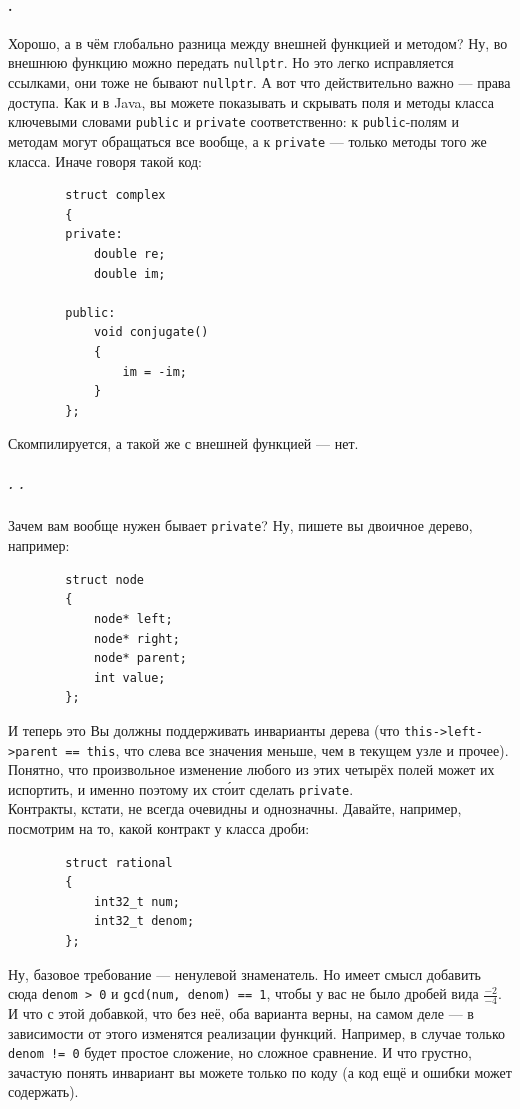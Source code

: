 \documentclass{article}
\begin{document}
    \paragraph{.}
    Хорошо, а в чём глобально разница между внешней функцией и методом? Ну, во внешнюю функцию можно передать \texttt{nullptr}. Но это легко исправляется ссылками, они тоже не бывают \texttt{nullptr}. А вот что действительно важно --- права доступа. Как и в Java, вы можете показывать и скрывать поля и методы класса ключевыми словами \texttt{public} и \texttt{private} соответственно: к \texttt{public}-полям и методам могут обращаться все вообще, а к \texttt{private} --- только методы того же класса. Иначе говоря такой код:
    \begin{verbatim}
        struct complex
        {
        private:
            double re;
            double im;

        public:
            void conjugate()
            {
                im = -im;
            }
        };
    \end{verbatim}
    Скомпилируется, а такой же с внешней функцией --- нет.
    \subparagraph{. .}
    Зачем вам вообще нужен бывает \texttt{private}? Ну, пишете вы двоичное дерево, например:
    \begin{verbatim}
        struct node
        {
            node* left;
            node* right;
            node* parent;
            int value;
        };
    \end{verbatim}
    И теперь это Вы должны поддерживать инварианты дерева (что \texttt{this->left->parent == this}, что слева все значения меньше, чем в текущем узле и прочее). Понятно, что произвольное изменение любого из этих четырёх полей может их испортить, и именно поэтому их ст\'{о}ит сделать \texttt{private}.\\
    Контракты, кстати, не всегда очевидны и однозначны. Давайте, например, посмотрим на то, какой контракт у класса дроби:
    \begin{verbatim}
        struct rational
        {
            int32_t num;
            int32_t denom;
        };
    \end{verbatim}
    Ну, базовое требование --- ненулевой знаменатель. Но имеет смысл добавить сюда \texttt{denom > 0} и \texttt{gcd(num, denom) == 1}, чтобы у вас не было дробей вида $\frac{-2}{-4}$. И что с этой добавкой, что без неё, оба варианта верны, на самом деле --- в зависимости от этого изменятся реализации функций. Например, в случае только \texttt{denom != 0} будет простое сложение, но сложное сравнение. И что грустно, зачастую понять инвариант вы можете только по коду (а код ещё и ошибки может содержать).\\
\end{document}
